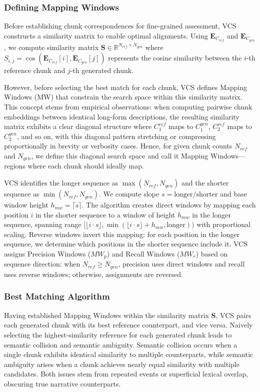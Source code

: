 \documentclass[main.tex]{subfiles}
\begin{document}
\subsubsection{Defining Mapping Windows}
Before establishing chunk correspondences for fine-grained assessment, VCS constructs a similarity matrix to enable optimal alignments. Using $\mathbf{E}_{C_{ref}}$ and $\mathbf{E}_{C_{gen}}$, we compute similarity matrix $\mathbf{S} \in \mathbb{R}^{N_{ref} \times N_{gen}}$ where $S_{i,j} = \cos(\mathbf{E}_{C_{ref}}[i], \mathbf{E}_{C_{gen}}[j])$ represents the cosine similarity between the $i$-th reference chunk and $j$-th generated chunk.

However, before selecting the best match for each chunk, VCS defines Mapping Windows (MW) that constrain the search space within this similarity matrix. This concept stems from empirical observations: when computing pairwise chunk embeddings between identical long-form descriptions, the resulting similarity matrix exhibits a clear diagonal structure where $C_1^{ref}$ maps to $C_1^{gen}$, $C_2^{ref}$ maps to $C_2^{gen}$, and so on, with this diagonal pattern stretching or compressing proportionally in brevity or verbosity cases. Hence, for given chunk counts $N_{ref}$ and $N_{gen}$, we define this diagonal search space and call it Mapping Windows—regions where each chunk should ideally map.

VCS identifies the longer sequence as $\max(N_{ref}, N_{gen})$ and the shorter sequence as $\min(N_{ref}, N_{gen})$. We compute slope $s = \text{longer}/\text{shorter}$ and base window height $h_{mw} = \lceil s \rceil$. The algorithm creates direct windows by mapping each position $i$ in the shorter sequence to a window of height $h_{mw}$ in the longer sequence, spanning range $[\lfloor i \cdot s \rfloor, \min(\lfloor i \cdot s \rfloor + h_{mw}, \text{longer}))$ with proportional scaling. Reverse windows invert this mapping: for each position in the longer sequence, we determine which positions in the shorter sequence include it. VCS assigns Precision Windows ($MW_p$) and Recall Windows ($MW_r$) based on sequence direction: when $N_{ref} \geq N_{gen}$, precision uses direct windows and recall uses reverse windows; otherwise, assignments are reversed.

\subsubsection{Best Matching Algorithm}
Having established Mapping Windows within the similarity matrix $\mathbf{S}$, VCS pairs each generated chunk with its best reference counterpart, and vice versa. Naively selecting the highest-similarity reference for each generated chunk leads to semantic collision and semantic ambiguity. Semantic collision occurs when a single chunk exhibits identical similarity to multiple counterparts, while semantic ambiguity arises when a chunk achieves nearly equal similarity with multiple candidates. Both issues stem from repeated events or superficial lexical overlap, obscuring true narrative counterparts.
\end{document}
